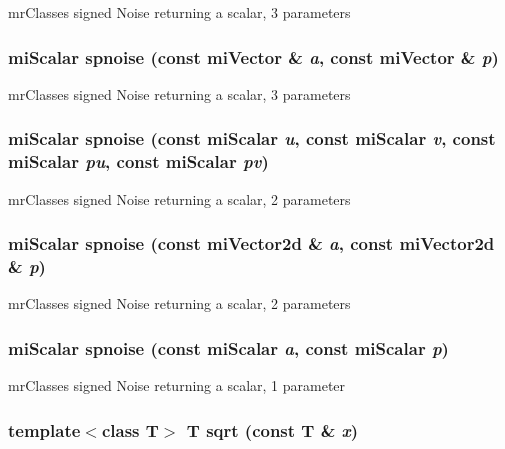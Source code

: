 mr\-Classes signed Noise returning a scalar, 3 parameters 

\subsubsection{\setlength{\rightskip}{0pt plus 5cm}mi\-Scalar spnoise (const mi\-Vector \& {\em a}, const mi\-Vector \& {\em p})\hspace{0.3cm}{\tt  [inline]}}\label{namespacersl_a87}


mr\-Classes signed Noise returning a scalar, 3 parameters 

\subsubsection{\setlength{\rightskip}{0pt plus 5cm}mi\-Scalar spnoise (const mi\-Scalar {\em u}, const mi\-Scalar {\em v}, const mi\-Scalar {\em pu}, const mi\-Scalar {\em pv})\hspace{0.3cm}{\tt  [inline]}}\label{namespacersl_a86}


mr\-Classes signed Noise returning a scalar, 2 parameters 

\subsubsection{\setlength{\rightskip}{0pt plus 5cm}mi\-Scalar spnoise (const mi\-Vector2d \& {\em a}, const mi\-Vector2d \& {\em p})\hspace{0.3cm}{\tt  [inline]}}\label{namespacersl_a85}


mr\-Classes signed Noise returning a scalar, 2 parameters 

\subsubsection{\setlength{\rightskip}{0pt plus 5cm}mi\-Scalar spnoise (const mi\-Scalar {\em a}, const mi\-Scalar {\em p})\hspace{0.3cm}{\tt  [inline]}}\label{namespacersl_a84}


mr\-Classes signed Noise returning a scalar, 1 parameter 

\subsubsection{\setlength{\rightskip}{0pt plus 5cm}template$<$class T$>$ T sqrt (const T \& {\em x})\hspace{0.3cm}{\tt  [inline]}}\label{namespacersl_a35}


